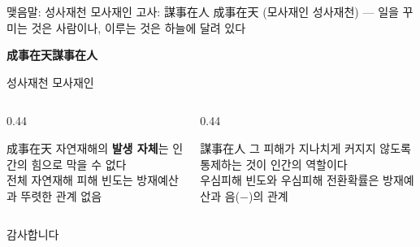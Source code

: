\documentclass[aspectratio=169,10pt]{beamer}
\begin{document}
\begin{frame}{맺음말: 성사재천 모사재인}
  \centering
  {\small\color{muted} 고사: 謀事在人 成事在天 (모사재인 성사재천) --- 일을 꾸미는 것은 사람이나, 이루는 것은 하늘에 달려 있다}

  \vspace{1.4em}
  {\Huge\bfseries 成事在天\quad\alert{謀事在人}}\par
  \vspace{0.4em}
  {\large 성사재천 \quad 모사재인}

  \vspace{1.6em}
  \begin{columns}[T]
    \begin{column}{0.44\textwidth}
      \begin{block}{成事在天}
        \small 자연재해의 \textbf{발생 자체}는 인간의 힘으로 막을 수 없다\\[3pt]
        {\footnotesize\color{muted} 전체 자연재해 피해 빈도는 방재예산과 뚜렷한 관계 없음}
      \end{block}
    \end{column}
    \begin{column}{0.44\textwidth}
      \begin{alertblock}{謀事在人}
        \small 그 피해가 \alert{지나치게 커지지 않도록 통제}하는 것이 인간의 역할이다\\[3pt]
        {\footnotesize\color{muted} 우심피해 빈도와 우심피해 전환확률은 방재예산과 음($-$)의 관계}
      \end{alertblock}
    \end{column}
  \end{columns}
\end{frame}

\begin{frame}[standout]
  감사합니다
\end{frame}
\end{document}

